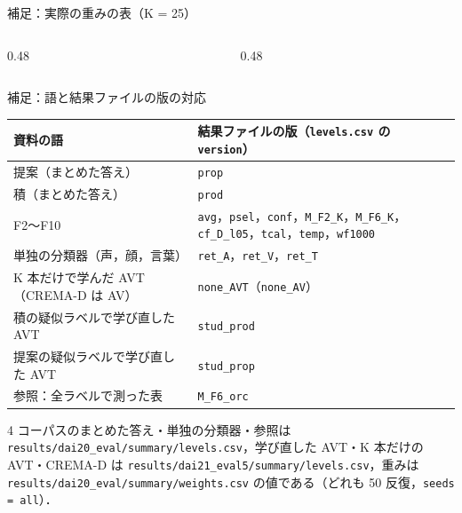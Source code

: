 \begin{frame}{補足：実際の重みの表（K = 25）}
\centering
\begin{columns}[T]
\begin{column}{0.48\linewidth}\centering
{}\par\vspace{0.6em}
\end{column}
\begin{column}{0.48\linewidth}\centering
{}\par\vspace{0.6em}
\end{column}
\end{columns}
\end{frame}

\begin{frame}{補足：語と結果ファイルの版の対応}
\centering\scriptsize
\begin{tabular}{ll}\toprule
資料の語 & 結果ファイルの版（\texttt{levels.csv} の \texttt{version}）\\\midrule
提案（まとめた答え） & \texttt{prop} \\
積（まとめた答え） & \texttt{prod} \\
F2〜F10 & \texttt{avg}，\texttt{psel}，\texttt{conf}，\texttt{M\_F2\_K}，\texttt{M\_F6\_K}，\texttt{cf\_D\_l05}，\texttt{tcal}，\texttt{temp}，\texttt{wf1000} \\
単独の分類器（声，顔，言葉） & \texttt{ret\_A}，\texttt{ret\_V}，\texttt{ret\_T} \\
K 本だけで学んだ AVT（CREMA-D は AV） & \texttt{none\_AVT}（\texttt{none\_AV}） \\
積の疑似ラベルで学び直した AVT & \texttt{stud\_prod} \\
提案の疑似ラベルで学び直した AVT & \texttt{stud\_prop} \\
参照：全ラベルで測った表 & \texttt{M\_F6\_orc} \\\bottomrule
\end{tabular}
\par\vspace{0.6em}\raggedright
4 コーパスのまとめた答え・単独の分類器・参照は \texttt{results/dai20\_eval/summary/levels.csv}，学び直した AVT・K 本だけの AVT・CREMA-D は \texttt{results/dai21\_eval5/summary/levels.csv}，重みは \texttt{results/dai20\_eval/summary/weights.csv} の値である（どれも 50 反復，\texttt{seeds = all}）．
\end{frame}


